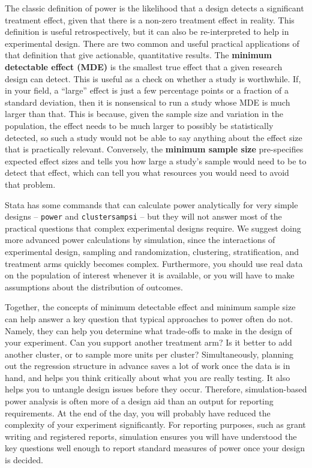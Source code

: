 The classic definition of power
is the likelihood that a design detects a significant treatment effect,
given that there is a non-zero treatment effect in reality.
This definition is useful retrospectively,
but it can also be re-interpreted to help in experimental design.
There are two common and useful practical applications
of that definition that give actionable, quantitative results.
The \textbf{minimum detectable effect (MDE)}
is the smallest true effect that a given research design can detect.
This is useful as a check on whether a study is worthwhile.
If, in your field, a ``large'' effect is just a few percentage points
or a fraction of a standard deviation,
then it is nonsensical to run a study whose MDE is much larger than that.
This is because, given the sample size and variation in the population,
the effect needs to be much larger to possibly be statistically detected,
so such a study would not be able to say anything about the effect size that is practically relevant.
Conversely, the \textbf{minimum sample size} pre-specifies expected effect sizes
and tells you how large a study's sample would need to be to detect that effect,
which can tell you what resources you would need to avoid that problem.

Stata has some commands that can calculate power analytically for
very simple designs -- \texttt{power} and \texttt{clustersampsi} --
but they will not answer most of the practical questions
that complex experimental designs require.
We suggest doing more advanced power calculations by simulation,
since the interactions of experimental design,
sampling and randomization,
clustering, stratification, and treatment arms
quickly becomes complex.
Furthermore, you should use real data on the population of interest whenever it is available,
or you will have to make assumptions about the distribution of outcomes.

Together, the concepts of minimum detectable effect
and minimum sample size can help answer a key question
that typical approaches to power often do not.
Namely, they can help you determine what trade-offs to make
in the design of your experiment.
Can you support another treatment arm?
Is it better to add another cluster,
or to sample more units per cluster?
Simultaneously, planning out the regression structure
in advance saves a lot of work once the data is in hand,
and helps you think critically about what you are really testing.
It also helps you to untangle design issues before they occur.
Therefore, simulation-based power analysis is often more of a design aid
than an output for reporting requirements.
At the end of the day, you will probably have reduced
the complexity of your experiment significantly.
For reporting purposes, such as grant writing and registered reports,
simulation ensures you will have understood the key questions well enough
to report standard measures of power once your design is decided.

